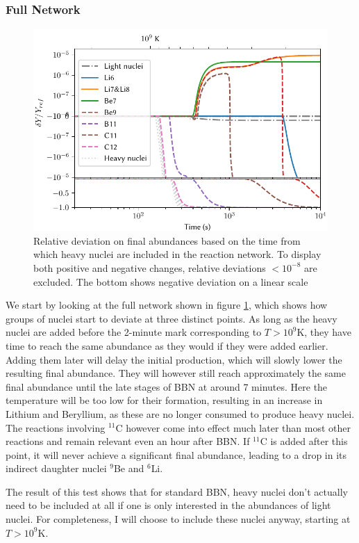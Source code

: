 \subsubsection{Full Network}
\begin{figure}[ht!]
    \includegraphics[width=5.1in]{figures/Bignettime.pdf}
    \caption{Relative deviation on final abundances based on the time from which heavy nuclei are included in the reaction network. To display both positive and negative changes, relative deviations $ <10^{-8}$ are excluded. The bottom shows negative deviation on a linear scale}
    \label{fig:bignettime}
\end{figure}
We start by looking at the full network shown in figure \ref{fig:bignettime}, which shows how groups of nuclei start to deviate at three distinct points. As long as the heavy nuclei are added before the 2-minute mark corresponding to $T>10^9$K, they have time to reach the same abundance as they would if they were added earlier. Adding them later will delay the initial production, which will slowly lower the resulting final abundance. They will however still reach approximately the same final abundance until the late stages of BBN at around 7 minutes. Here the temperature will be too low for their formation, resulting in an increase in Lithium and Beryllium, as these are no longer consumed to produce heavy nuclei. 
The reactions involving ${}^{11}$C however come into effect much later than most other reactions and remain relevant even an hour after BBN. If ${}^{11}$C is added after this point, it will never achieve a significant final abundance, leading to a drop in its indirect daughter nuclei ${}^{9}$Be and ${}^{6}$Li. 

The result of this test shows that for standard BBN, heavy nuclei don't actually need to be included at all if one is only interested in the abundances of light nuclei. For completeness, I will choose to include these nuclei anyway, starting at $T>10^9$K. 

